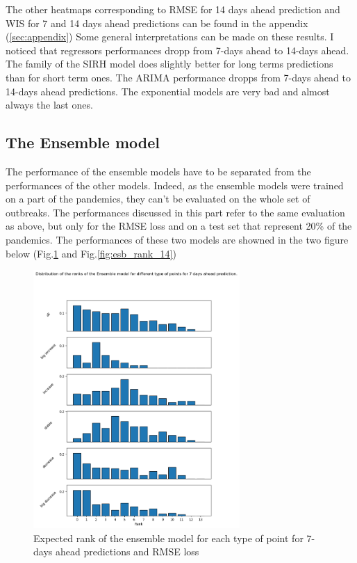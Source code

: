 The other heatmaps corresponding to RMSE for 14 days ahead prediction and WIS for 7 and 14 days ahead predictions can be found in the appendix (\ref{sec:appendix})
Some general interpretations can be made on these results. 
I noticed that regressors performances dropp from 7-days ahead to 14-days ahead. 
The family of the SIRH model does slightly better for long terms predictions than for short term ones. 
The ARIMA performance dropps from 7-days ahead to 14-days ahead predictions. 
The exponential models are very bad and almost always the last ones. 

\subsection{The Ensemble model}
The performance of the ensemble models have to be separated from the performances of the other models. 
Indeed, as the ensemble models were trained on a part of the pandemics, they can't be evaluated on the whole set of outbreaks. 
The performances discussed in this part refer to the same evaluation as above, but only for the RMSE loss and on a test set that represent 20\% of the pandemics. 
The performances of these two models are showned in the two figure below (Fig.\ref{fig:esb_rank_7} and Fig.\ref{fig:esb_rank_14})

\begin{figure}
    \centering
    \includegraphics[width=0.7\textwidth]{figures/esb_rank_7.png}
    \caption{Expected rank of the ensemble model for each type of point for 7-days ahead predictions and RMSE loss}
    \label{fig:esb_rank_7}
\end{figure}

